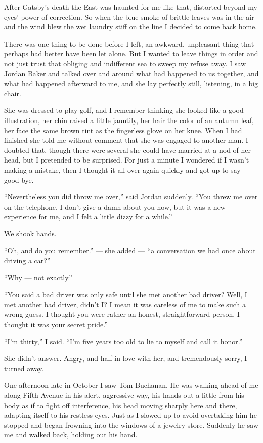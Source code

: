 \documentclass{znotebook}
\begin{document}
After Gatsby's death the East was haunted for me like that, distorted beyond my eyes' power of correction. So when the blue smoke of brittle leaves was in the air and the wind blew the wet laundry stiff on the line I decided to come back home.

There was one thing to be done before I left, an awkward, unpleasant thing that perhaps had better have been let alone. But I wanted to leave things in order and not just trust that obliging and indifferent sea to sweep my refuse away. I saw Jordan Baker and talked over and around what had happened to us together, and what had happened afterward to me, and she lay perfectly still, listening, in a big chair.

She was dressed to play golf, and I remember thinking she looked like a good illustration, her chin raised a little jauntily, her hair the color of an autumn leaf, her face the same brown tint as the fingerless glove on her knee. When I had finished she told me without comment that she was engaged to another man. I doubted that, though there were several she could have married at a nod of her head, but I pretended to be surprised. For just a minute I wondered if I wasn't making a mistake, then I thought it all over again quickly and got up to say good-bye.

``Nevertheless you did throw me over,'' said Jordan suddenly. ``You threw me over on the telephone. I don't give a damn about you now, but it was a new experience for me, and I felt a little dizzy for a while.''

We shook hands.

``Oh, and do you remember.'' ---{} she added ---{} ``a conversation we had once about driving a car?''

``Why ---{} not exactly.''

``You said a bad driver was only safe until she met another bad driver? Well, I met another bad driver, didn't I? I mean it was careless of me to make such a wrong guess. I thought you were rather an honest, straightforward person. I thought it was your secret pride.''

``I'm thirty,'' I said. ``I'm five years too old to lie to myself and call it honor.''

She didn't answer. Angry, and half in love with her, and tremendously sorry, I turned away.

One afternoon late in October I saw Tom Buchanan. He was walking ahead of me along Fifth Avenue in his alert, aggressive way, his hands out a little from his body as if to fight off interference, his head moving sharply here and there, adapting itself to his restless eyes. Just as I slowed up to avoid overtaking him he stopped and began frowning into the windows of a jewelry store. Suddenly he saw me and walked back, holding out his hand.
\end{document}
